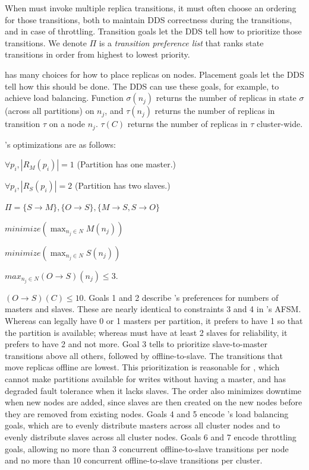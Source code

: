 When \helix must invoke
multiple replica transitions, it must often choose an ordering for those
transitions, both to maintain DDS correctness during the transitions, and in
case of throttling.  Transition goals let the DDS
tell \helix how to prioritize those transitions. 
We denote $\Pi$ is a \emph{transition preference list} that ranks
state transitions in order from highest to lowest priority.  

\helix has many choices for how to place replicas on nodes.  Placement goals let
the DDS tell \helix how this should be done.  The DDS can use these
goals, for example, to achieve load balancing.  
Function $\sigma(n_j)$ returns the number of replicas in state $\sigma$
(across all partitions) on $n_j$, and $\tau(n_j)$ returns the number of
replicas in transition $\tau$ on a node $n_j$.  $\tau(C)$ returns the number of
replicas in $\tau$ cluster-wide.  


\ES's optimizations are as follows:  
\be
\item $\forall p_i, |R_M(p_i)| = 1$  (Partition has one
master.)
\item $\forall p_i, |R_S(p_i)| = 2$  (Partition has two slaves.)   
\item $\Pi=\{S \rightarrow M\}, \{O \rightarrow S\}, \{M \rightarrow S, S
\rightarrow O\}$
\item $minimize(\max_{{n_j} \in N}M(n_j))$
\item $minimize(\max_{{n_j} \in N}S(n_j))$
\item $max_{{n_j} \in N}(O \rightarrow S)(n_j) \le 3$.
\item $(O \rightarrow S)(C) \le 10$.
\ee
Goals 1 and 2 describe \ES's preferences for numbers of masters and
slaves.  These are nearly identical to constraints 3 and 4 in \ES's AFSM.
Whereas \ES can legally have 0 or 1 masters per partition, it prefers to have 1
so that the partition is available; whereas \ES must have at least 2 slaves for
reliability, it prefers to have 2 and not more.
Goal 3 tells \helix to prioritize slave-to-master transitions above all
others, followed by offline-to-slave.  The transitions that move replicas
offline are lowest.  This prioritization is reasonable for \ES, which cannot
make partitions available for writes without having a master, and has degraded 
fault tolerance when it lacks slaves.  The order also minimizes downtime when new nodes
are added, since slaves are then created on the new nodes before they are removed
from existing nodes. 
Goals 4 and 5 encode \ES's load
balancing goals, which are to evenly distribute masters across all cluster nodes
and to evenly distribute slaves across all cluster nodes.  Goals 6 and 7 encode
throttling goals, allowing no more than 3 concurrent offline-to-slave transitions per node
and no more than 10 concurrent offline-to-slave transitions per cluster.

